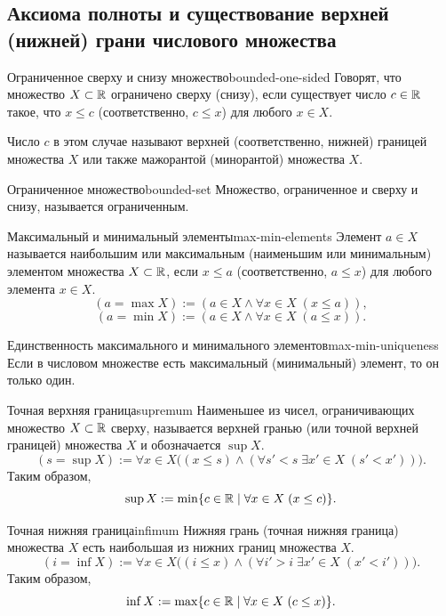 \subsection{Аксиома полноты и существование верхней (нижней) грани числового множества}

\begin{definition}{Ограниченное сверху и снизу множество}{bounded-one-sided}
  Говорят, что множество $X\subset\mathbb{R}$ ограничено сверху (снизу), если
  существует число $c\in\mathbb{R}$ такое, что $x\le c$ (соответственно, $c\le x$)
  для любого $x\in X$.

  Число $c$ в этом случае называют верхней (соответственно, нижней) границей
  множества $X$ или также мажорантой (минорантой) множества $X$.
\end{definition}

\begin{definition}{Ограниченное множество}{bounded-set}
  Множество, ограниченное и сверху и снизу, называется ограниченным.
\end{definition}

\begin{definition}{Максимальный и минимальный элементы}{max-min-elements}
  Элемент $a\in X$ называется наибольшим или максимальным (наименьшим или
  минимальным) элементом множества $X\subset\mathbb{R}$, если $x\le a$
  (соответственно, $a\le x$) для любого элемента $x\in X$.
  \[
    (a=\max X):=(a\in X\land\forall x\in X\;(x\le a)),
  \]
  \[
    (a=\min X):=(a\in X\land\forall x\in X\;(a\le x)).
  \]
\end{definition}

\begin{properties}{Единственность максимального и минимального элементов}{max-min-uniqueness}
  Если в числовом множестве есть максимальный (минимальный) элемент, то он
  только один.
\end{properties}

\begin{definition}{Точная верхняя граница}{supremum}
  Наименьшее из чисел, ограничивающих множество $X\subset\mathbb{R}$ сверху,
  называется верхней гранью (или точной верхней границей) множества $X$ и
  обозначается $\sup X$.
  \[
    (s=\sup X):=
    \forall x\in X\bigl((x\le s)\land
      (\forall s'<s\;\exists x'\in X\;(s'<x'))\bigr).
  \]
  Таким образом,
  \[
    \sup X:=\min\{c\in\mathbb{R}\mid\forall x\in X\;(x\le c)\}.
  \]
\end{definition}

\begin{definition}{Точная нижняя граница}{infimum}
  Нижняя грань (точная нижняя граница) множества $X$ есть наибольшая из
  нижних границ множества $X$.
  \[
    (i=\inf X):=
    \forall x\in X\bigl((i\le x)\land
      (\forall i'>i\;\exists x'\in X\;(x'<i'))\bigr).
  \]
  Таким образом,
  \[
    \inf X:=\max\{c\in\mathbb{R}\mid\forall x\in X\;(c\le x)\}.
  \]
\end{definition}

